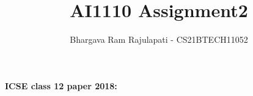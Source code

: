 \documentclass[journal,12pt,twocolumn]{IEEEtran}
\DeclareMathOperator*{\Res}{Res}
\begin{document}
	
\newcommand{\BEQA}{\begin{eqnarray}}
\newcommand{\EEQA}{\end{eqnarray}}
\newcommand{\define}{\stackrel{\triangle}{=}}

\raggedbottom
\setlength{\parindent}{0pt}
\providecommand{\mbf}{\mathbf}
\providecommand{\pr}[1]{\ensuremath{\Pr\left(#1\right)}}
\providecommand{\qfunc}[1]{\ensuremath{Q\left(#1\right)}}
\providecommand{\sbrak}[1]{\ensuremath{{}\left[#1\right]}}
\providecommand{\lsbrak}[1]{\ensuremath{{}\left[#1\right.}}
\providecommand{\rsbrak}[1]{\ensuremath{{}\left.#1\right]}}
\providecommand{\brak}[1]{\ensuremath{\left(#1\right)}}
\providecommand{\lbrak}[1]{\ensuremath{\left(#1\right.}}
\providecommand{\rbrak}[1]{\ensuremath{\left.#1\right)}}
\providecommand{\cbrak}[1]{\ensuremath{\left\{#1\right\}}}
\providecommand{\lcbrak}[1]{\ensuremath{\left\{#1\right.}}
\providecommand{\rcbrak}[1]{\ensuremath{\left.#1\right\}}}
\theoremstyle{remark}
\newtheorem{rem}{Remark}
\newcommand{\sgn}{\mathop{\mathrm{sgn}}}
\providecommand{\abs}[1]{$\left\vert#1\right\vert$}
\providecommand{\res}[1]{\Res\displaylimits_{#1}} 
\providecommand{\norm}[1]{$\left\lVert#1\right\rVert$}
\providecommand{\mtx}[1]{\mathbf{#1}}
\providecommand{\mean}[1]{E$\left[ #1 \right]$}
\providecommand{\fourier}{\overset{\mathcal{F}}{ \rightleftharpoons}}
\providecommand{\system}{\overset{\mathcal{H}}{ \longleftrightarrow}}
\newcommand{\solution}{\noindent \textbf{Solution: }}
\newcommand{\cosec}{\,\text{cosec}\,}
\providecommand{\dec}[2]{\ensuremath{\overset{#1}{\underset{#2}{\gtrless}}}}
\newcommand{\myvec}[1]{\ensuremath{\begin{pmatrix}#1\end{pmatrix}}}
\newcommand{\mydet}[1]{\ensuremath{\begin{vmatrix}#1\end{vmatrix}}}
\makeatletter
\makeatother
\let\StandardTheFigure\thefigure
\let\vec\mathbf
	
\vspace{3cm}
\title{AI1110 Assignment2}
\author{Bhargava Ram Rajulapati - CS21BTECH11052}
\maketitle
\newpage
\bigskip
\renewcommand{\thefigure}{\theenumi}
\renewcommand{\thetable}{\theenumi}
\textbf{ICSE class 12 paper 2018:}
    
\end{document}

